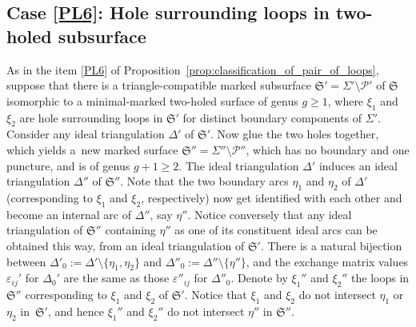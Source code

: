 \documentclass[10pt,a4paper]{amsart}
\numberwithin{equation}{section}
\theoremstyle{definition}
\begin{document}
\subsection{Case {\ref{PL6}}: Hole surrounding loops in two-holed subsurface}
As in the item \ref{PL6} of Proposition~\ref{prop:classification_of_pair_of_loops}, suppose that there is a triangle-compatible marked subsurface $\mathfrak{S}'=\Sigma'\setminus\mathcal{P}'$ of $\mathfrak{S}$ isomorphic to a minimal-marked two-holed surface of genus $g\ge 1$, where $\xi_1$ and $\xi_2$ are hole surrounding loops in $\mathfrak{S}'$ for distinct boundary components of $\Sigma'$.
Consider any ideal triangulation $\Delta'$ of $\mathfrak{S}'$. Now glue the two holes together, which yields a~new marked surface $\mathfrak{S}'' = \Sigma'' \setminus \mathcal{P}''$, which has no boundary and one puncture, and is of genus $g+1 \ge 2$. The ideal triangulation $\Delta'$ induces an ideal triangulation $\Delta''$ of $\mathfrak{S}''$. Note that the two boundary arcs $\eta_1$ and $\eta_2$ of $\Delta'$ (corresponding to $\xi_1$ and $\xi_2$, respectively) now get identified with each other and become an internal arc of $\Delta''$, say $\eta''$. Notice conversely that any ideal triangulation of $\mathfrak{S}''$ containing $\eta''$ as one of its constituent ideal arcs can be obtained this way, from an ideal triangulation of $\mathfrak{S}'$.
There is a natural bijection between $\Delta'_0 := \Delta' \setminus\{\eta_1,\eta_2\}$ and $\Delta''_0 := \Delta'' \setminus\{\eta''\}$, and the exchange matrix values $\varepsilon_{ij}'$ for $\Delta_0'$ are the same as those $\varepsilon''_{ij}$ for $\Delta''_0$. Denote by $\xi_1''$ and $\xi_2''$ the loops in $\mathfrak{S}''$ corresponding to $\xi_1$ and $\xi_2$ of $\mathfrak{S}'$. Notice that $\xi_1$ and $\xi_2$ do not intersect $\eta_1$ or $\eta_2$ in~$\mathfrak{S}'$, and hence $\xi_1''$ and $\xi_2''$ do not intersect $\eta''$ in $\mathfrak{S}''$.
\end{document}
